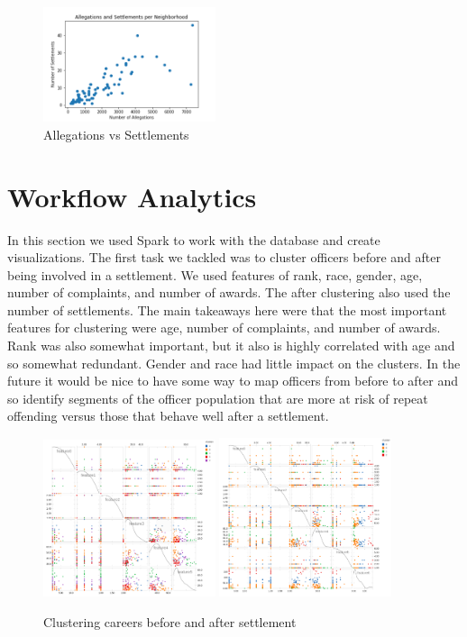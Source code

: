 \documentclass[11pt]{article}
\begin{document}
\begin{figure}[h!]
\centering
\caption{Allegations vs Settlements}
\includegraphics[width=0.45\textwidth]{alleg_scatter.png}
\end{figure}

\FloatBarrier
\section{Workflow Analytics}

In this section we used Spark to work with the database and create visualizations. The first task we tackled was to cluster officers before and after being involved in a settlement. We used features of rank, race, gender, age, number of complaints, and number of awards. The after clustering also used the number of settlements. The main takeaways here were that the most important features for clustering were age, number of complaints, and number of awards. Rank was also somewhat important, but it also is highly correlated with age and so somewhat redundant. Gender and race had little impact on the clusters. In the future it would be nice to have some way to map officers from before to after and so identify segments of the officer population that are more at risk of repeat offending versus those that behave well after a settlement.

\begin{figure}[h!]
\centering
\caption{Clustering careers before and after settlement}
\includegraphics[width=0.45\textwidth]{cluster.png}
\includegraphics[width=0.45\textwidth]{cluster2.png}
\end{figure}
\end{document}
